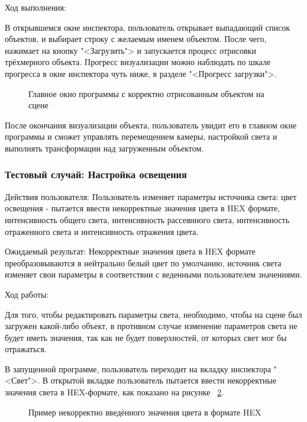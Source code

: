 Ход выполнения:

В открывшемся окне инспектора, пользователь открывает выпадающий список объектов, и выбирает строку с желаемым именем объектом. После чего, нажимает на кнопку "<Загрузить"> и запускается процесс отрисовки трёхмерного объекта. Прогресс визуализации можно наблюдать по шкале прогресса в окне инспектора чуть ниже, в разделе "<Прогресс загрузки">.

\begin{figure}[H]
	\caption{Главное окно программы с корректно отрисованным объектом на сцене}
	\label{screen15:image}
\end{figure}

После окончания визуализации объекта, пользователь увидит его в главном окне программы и сможет управлять перемещением камеры, настройкой света и выполнять трансформации над загруженным объектом.

\subsubsection{Тестовый случай: Настройка освещения}
Действия пользователя: Пользователь изменяет параметры источника света: цвет освещения - пытается ввести некорректные значения цвета в HEX формате, интенсивность общего света, интенсивность рассеянного света, интенсивность отраженного света и интенсивность отражения цвета.

Ожидаемый результат: Некорректные значения цвета в HEX формате преобразовываются в нейтрально белый цвет по умолчанию, источник света изменяет свои параметры в соответствии с веденными пользователем значениями.

Ход работы:

Для того, чтобы редактировать параметры света, необходимо, чтобы на сцене был загружен какой-либо объект, в противном случае изменение параметров света не будет иметь значения, так как не будет поверхностей, от которых свет мог бы отражаться.

В запущенной программе, пользователь переходит на вкладку инспектора "<Свет">. В открытой вкладке пользователь пытается ввести некорректные значения света в HEX-формате, как показано на рисунке ~\ref{screen17:image}. 

\begin{figure}[H]
	\caption{Пример некорректно введённого значения цвета в формате HEX}
	\label{screen17:image}
\end{figure}

